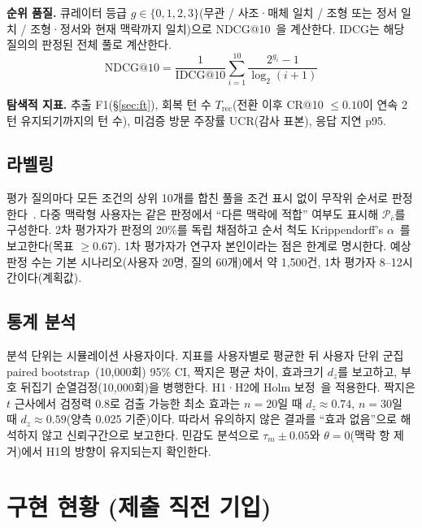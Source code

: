 \documentclass[10pt,twocolumn,letterpaper]{article}
\newcommand{\cP}{\mathcal{P}}
\begin{document}
\textbf{순위 품질.} 큐레이터 등급 $g\in\{0,1,2,3\}$(무관 / 사조·매체 일치 / 조형 또는 정서 일치 / 조형·정서와 현재 맥락까지 일치)으로 NDCG@10~\cite{jarvelin2002ndcg}을 계산한다. IDCG는 해당 질의의 판정된 전체 풀로 계산한다.
\begin{equation}
\mathrm{NDCG@10}=\frac{1}{\mathrm{IDCG@10}}\sum_{i=1}^{10}\frac{2^{g_i}-1}{\log_2(i+1)}
\label{eq:ndcg}
\end{equation}

\textbf{탐색적 지표.} 추출 F1(§\ref{sec:ft}), 회복 턴 수 $T_{\mathrm{rec}}$(전환 이후 CR@10 $\le0.10$이 연속 2턴 유지되기까지의 턴 수), 미검증 방문 주장률 UCR(감사 표본), 응답 지연 p95.

\subsection{라벨링}
평가 질의마다 모든 조건의 상위 10개를 합친 풀을 조건 표시 없이 무작위 순서로 판정한다~\cite{buckley2004incomplete}. 다중 맥락형 사용자는 같은 판정에서 ``다른 맥락에 적합'' 여부도 표시해 $\cP_{\bar c}$를 구성한다. 2차 평가자가 판정의 20\%를 독립 채점하고 순서 척도 Krippendorff's $\alpha$~\cite{hayes2007alpha}를 보고한다(목표 $\ge0.67$). 1차 평가자가 연구자 본인이라는 점은 한계로 명시한다. 예상 판정 수는 기본 시나리오(사용자 20명, 질의 60개)에서 약 1,500건, 1차 평가자 8–12시간이다(계획값).

\subsection{통계 분석}
분석 단위는 시뮬레이션 사용자이다. 지표를 사용자별로 평균한 뒤 사용자 단위 군집 paired bootstrap~\cite{efron1993bootstrap}(10,000회) 95\% CI, 짝지은 평균 차이, 효과크기 $d_z$를 보고하고, 부호 뒤집기 순열검정(10,000회)을 병행한다. H1·H2에 Holm 보정~\cite{holm1979}을 적용한다. 짝지은 $t$ 근사에서 검정력 0.8로 검출 가능한 최소 효과는 $n=20$일 때 $d_z\approx0.74$, $n=30$일 때 $d_z\approx0.59$(양측 0.025 기준)이다. 따라서 유의하지 않은 결과를 ``효과 없음''으로 해석하지 않고 신뢰구간으로 보고한다. 민감도 분석으로 $\tau_m\pm0.05$와 $\theta=0$(맥락 항 제거)에서 H1의 방향이 유지되는지 확인한다.

\section{구현 현황 (제출 직전 기입)}
\label{sec:status}
\end{document}
